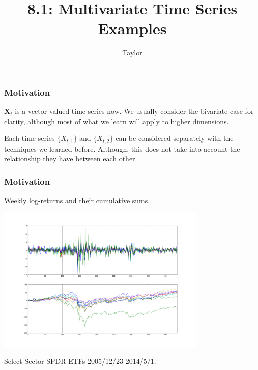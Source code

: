 \documentclass{beamer}
\title["8.1"]{8.1: Multivariate Time Series Examples}
\author{Taylor}
\institute[UVA] 
{
University of Virginia \\
\medskip
\textit{} 
}
\date{}
\begin{document}

\begin{frame}
\titlepage 
\end{frame}

\begin{frame}
\frametitle{Motivation}

$\mathbf{X}_t$ is a vector-valued time series now. We usually consider the bivariate case for clarity, although most of what we learn will apply to higher dimensions.
\newline

Each time series $\{X_{t,1}\}$ and $\{X_{t,2}\}$ can be considered separately with the techniques we learned before. Although, this does not take into account the relationship they have between each other.
\end{frame}


\begin{frame}
\frametitle{Motivation}

Weekly log-returns and their cumulative sums.
\begin{centering}
\includegraphics[width=100mm]{./pics/weekly_etfs.png}
\end{centering}
Select Sector SPDR ETFs 2005/12/23-2014/5/1. 


\end{frame}



\end{document}
